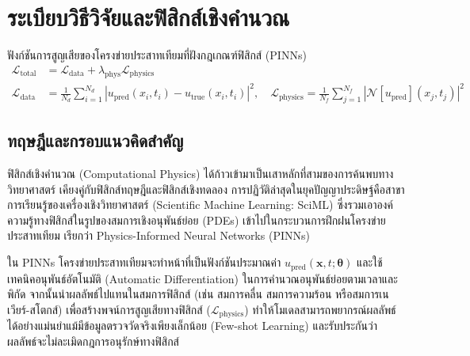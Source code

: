 
\chapter{ระเบียบวิธีวิจัยและฟิสิกส์เชิงคำนวณ}
\label{ch:chapter08}


\vspace{0.4cm}

\begin{equationsbox}{ฟังก์ชันการสูญเสียของโครงข่ายประสาทเทียมที่ฝังกฎเกณฑ์ฟิสิกส์ (PINNs)}
\begin{align}
\mathcal{L}_{\text{total}} &= \mathcal{L}_{\text{data}} + \lambda_{\text{phys}} \mathcal{L}_{\text{physics}} \\
\mathcal{L}_{\text{data}} &= \frac{1}{N_d}\sum_{i=1}^{N_d}|u_{\text{pred}}(x_i, t_i) - u_{\text{true}}(x_i, t_i)|^2, \quad \mathcal{L}_{\text{physics}} = \frac{1}{N_f}\sum_{j=1}^{N_f}\left|\mathcal{N}[u_{\text{pred}}](x_j, t_j)\right|^2
\end{align}
\end{equationsbox}

\section{ทฤษฎีและกรอบแนวคิดสำคัญ}

ฟิสิกส์เชิงคำนวณ (Computational Physics) ได้ก้าวเข้ามาเป็นเสาหลักที่สามของการค้นพบทางวิทยาศาสตร์ เคียงคู่กับฟิสิกส์ทฤษฎีและฟิสิกส์เชิงทดลอง การปฏิวัติล่าสุดในยุคปัญญาประดิษฐ์คือสาขาการเรียนรู้ของเครื่องเชิงวิทยาศาสตร์ (Scientific Machine Learning: SciML) ซึ่งรวมเอาองค์ความรู้ทางฟิสิกส์ในรูปของสมการเชิงอนุพันธ์ย่อย (PDEs) เข้าไปในกระบวนการฝึกฝนโครงข่ายประสาทเทียม เรียกว่า Physics-Informed Neural Networks (PINNs)

ใน PINNs โครงข่ายประสาทเทียมจะทำหน้าที่เป็นฟังก์ชันประมาณค่า $u_{\text{pred}}(\mathbf{x}, t; \boldsymbol{\theta})$ และใช้เทคนิคอนุพันธ์อัตโนมัติ (Automatic Differentiation) ในการคำนวณอนุพันธ์ย่อยตามเวลาและพิกัด จากนั้นนำผลลัพธ์ไปแทนในสมการฟิสิกส์ (เช่น สมการคลื่น สมการความร้อน หรือสมการเนเวียร์-สโตกส์) เพื่อสร้างพจน์การสูญเสียทางฟิสิกส์ ($\mathcal{L}_{\text{physics}}$) ทำให้โมเดลสามารถพยากรณ์ผลลัพธ์ได้อย่างแม่นยำแม้มีข้อมูลตรวจวัดจริงเพียงเล็กน้อย (Few-shot Learning) และรับประกันว่าผลลัพธ์จะไม่ละเมิดกฎการอนุรักษ์ทางฟิสิกส์

